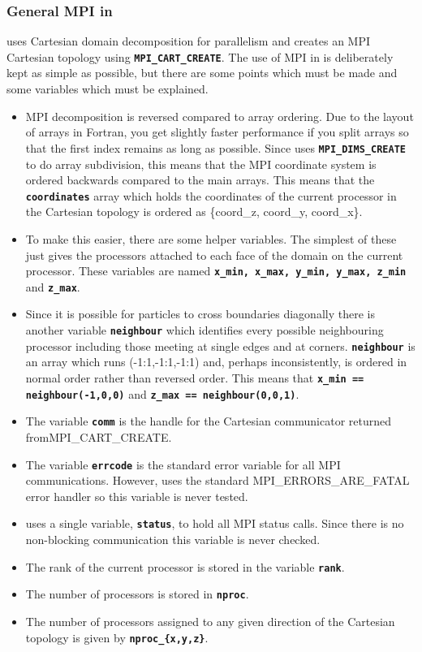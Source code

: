 \documentclass[12pt,a4paper]{article}
\newcommand{\inlinecode}[1]{{\color{warwickred} \bf\texttt{#1}}}
\newcommand{\EPOCH}{{\color{warwickdark}\fontfamily{phv}\selectfont{EPOCH}}}
\begin{document}
\subsubsection{General MPI in {\EPOCH}}
{\EPOCH} uses Cartesian domain decomposition for parallelism and creates an MPI
Cartesian topology using \inlinecode{MPI\_CART\_CREATE}. The use of MPI in
{\EPOCH} is deliberately kept as simple as possible, but there are some points
which must be made and some variables which must be explained.
\begin{itemize}
\item MPI decomposition is reversed compared to array ordering. Due to the
  layout of arrays in Fortran, you get slightly faster performance if you split
  arrays so that the first index remains as long as possible. Since {\EPOCH}
  uses \inlinecode{MPI\_DIMS\_CREATE} to do array subdivision, this means that
  the MPI coordinate system is ordered backwards compared to the main arrays.
  This means that the \inlinecode{coordinates} array which holds the
  coordinates of the current processor in the Cartesian topology is ordered
  as \{coord\_z, coord\_y, coord\_x\}.
\item To make this easier, there are some helper variables. The simplest of
  these just gives the processors attached to each face of the domain on the
  current processor. These variables are named \inlinecode{x\_min, x\_max,
  y\_min, y\_max, z\_min} and \inlinecode{z\_max}.
\item Since it is possible for particles to cross boundaries diagonally there
  is another variable \inlinecode{neighbour} which identifies every possible
  neighbouring processor including those meeting at single edges and at
  corners. \inlinecode{neighbour} is an array which runs (-1:1,-1:1,-1:1) and,
  perhaps inconsistently, is ordered in normal order rather than reversed
  order. This means that \inlinecode{x\_min == neighbour(-1,0,0)} and
  \inlinecode{z\_max == neighbour(0,0,1)}.
\item The variable \inlinecode{comm} is the handle for the Cartesian
  communicator returned from\linebreak MPI\_CART\_CREATE.
\item The variable \inlinecode{errcode} is the standard error variable for all
  MPI communications. However, {\EPOCH} uses the standard
  MPI\_ERRORS\_ARE\_FATAL error handler so this variable is never tested.
\item {\EPOCH} uses a single variable, \inlinecode{status}, to hold all MPI
  status calls. Since there is no non-blocking communication this variable
  is never checked.
\item The rank of the current processor is stored in the variable
  \inlinecode{rank}.
\item The number of processors is stored in \inlinecode{nproc}.
\item The number of processors assigned to any given direction of the Cartesian
  topology is given by \inlinecode{nproc\_\{x,y,z\}}.
\end{itemize}
\end{document}
